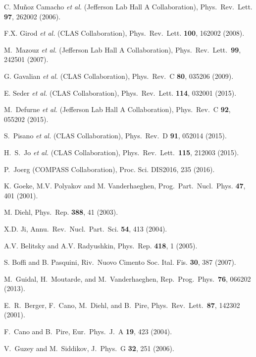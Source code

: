 \documentclass[twocolumn,nofootinbib,prl,superscriptaddress,secnumarabic,amssymb,nobibnotes,aps,floatfix]{revtex4}
\begin{document}
\begin{thebibliography}{99}
 C. Mu\~noz Camacho {\it et al.} (Jefferson Lab 
   Hall A Collaboration),
Phys.\ Rev.\ Lett. {\bf 97}, 262002 (2006).

 F.X. Girod {\it et al.} (CLAS Collaboration),
Phys.\ Rev.\ Lett. {\bf 100}, 162002 (2008).

 M.~Mazouz {\it et al.} (Jefferson Lab Hall A 
   Collaboration),
   Phys.\ Rev.\ Lett.\  {\bf 99}, 242501 (2007).

 G. Gavalian {\it et al.} (CLAS Collaboration),
Phys.\ Rev.\ C {\bf 80}, 035206 (2009).

 E. Seder {\it et al.} (CLAS Collaboration),
Phys.\ Rev.\ Lett. {\bf 114}, 032001 (2015).

 M.~Defurne {\it et al.} (Jefferson Lab Hall A 
   Collaboration),
  Phys.\ Rev.\ C {\bf 92}, 055202 (2015).

 S.~Pisano {\it et al.} (CLAS Collaboration),
Phys.\ Rev.\ D {\bf 91}, 052014 (2015).

   H.~S.~Jo {\it et al.} (CLAS Collaboration),
  Phys.\ Rev.\ Lett.\  {\bf 115}, 212003 (2015).

 P.~Joerg (COMPASS Collaboration),
  Proc. Sci. DIS2016, 235 (2016).

K. Goeke, M.V. Polyakov and M. Vanderhaeghen,
Prog.\ Part.\ Nucl.\ Phys. {\bf 47}, 401 (2001).

M. Diehl,
Phys.\ Rep. {\bf 388}, 41 (2003).

X.D. Ji,
Annu.\ Rev.\ Nucl.\ Part.\ Sci. {\bf 54}, 413 (2004).

A.V. Belitsky and A.V. Radyushkin,
Phys.\ Rep. {\bf 418}, 1 (2005).

 S. Boffi and B. Pasquini,
Riv.\ Nuovo Cimento Soc. Ital. Fis. {\bf 30}, 387 (2007).

 M.~Guidal, H.~Moutarde, and M.~Vanderhaeghen,
Rep.\ Prog.\ Phys.\  {\bf 76}, 066202 (2013).

 E.~R.~Berger, F.~Cano, M.~Diehl, and B.~Pire,
  Phys.\ Rev.\ Lett.\  {\bf 87}, 142302 (2001).

  F.~Cano and B.~Pire,
  Eur.\ Phys.\ J.\ A {\bf 19}, 423 (2004).

  V.~Guzey and M.~Siddikov,
  J.\ Phys.\ G {\bf 32}, 251 (2006).


\end{thebibliography}
\end{document}

